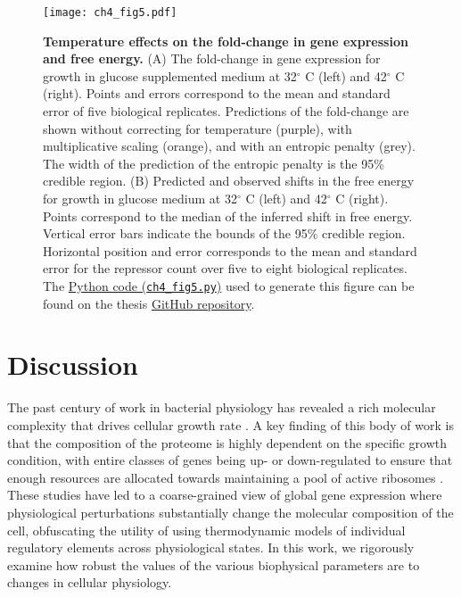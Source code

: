 \documentclass[12pt]{caltech_thesis}
\begin{document}
\hypertarget{fig:deltaF_temp}{%
\begin{figure}
\centering
\texttt{[image: ch4\_fig5.pdf]}
\caption[{Temperature effects on the fold-change in gene expression and
free energy.}]{\textbf{Temperature effects on the fold-change in gene
expression and free energy.} (A) The fold-change in gene expression for
growth in glucose supplemented medium at 32\(^\circ\) C (left) and
42\(^\circ\) C (right). Points and errors correspond to the mean and
standard error of five biological replicates. Predictions of the
fold-change are shown without correcting for temperature (purple), with
multiplicative scaling (orange), and with an entropic penalty (grey).
The width of the prediction of the entropic penalty is the 95\% credible
region. (B) Predicted and observed shifts in the free energy for growth
in glucose medium at 32\(^\circ\) C (left) and 42\(^\circ\) C (right).
Points correspond to the median of the inferred shift in free energy.
Vertical error bars indicate the bounds of the 95\% credible region.
Horizontal position and error corresponds to the mean and standard error
for the repressor count over five to eight biological replicates. The
\href{https://github.com/gchure/phd/blob/master/src/chapter_04/code/ch4_fig5.py}{Python
code (\texttt{ch4\_fig5.py})} used to generate this figure can be found
on the thesis \href{https://github.com/gchure/phd}{GitHub repository}.}
\label{fig:deltaF_temp}
\end{figure}
}

\hypertarget{discussion-2}{%
\section{Discussion}\label{discussion-2}}

The past century of work in bacterial physiology has revealed a rich
molecular complexity that drives cellular growth rate
\autocite{jun2018}. A key finding of this body of work is that the
composition of the proteome is highly dependent on the specific growth
condition, with entire classes of genes being up- or down-regulated to
ensure that enough resources are allocated towards maintaining a pool of
active ribosomes \autocite{hui2015,scott2014}. These studies have led to
a coarse-grained view of global gene expression where physiological
perturbations substantially change the molecular composition of the
cell, obfuscating the utility of using thermodynamic models of
individual regulatory elements across physiological states. In this
work, we rigorously examine how robust the values of the various
biophysical parameters are to changes in cellular physiology.
\end{document}
